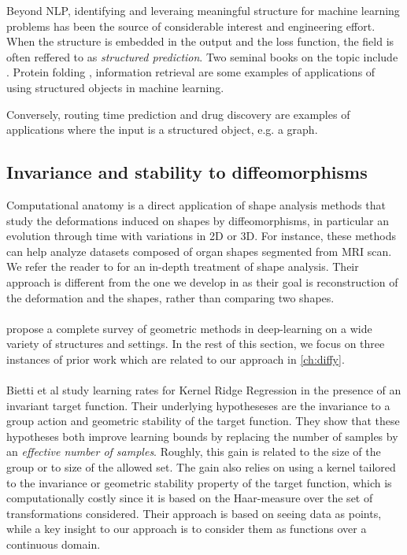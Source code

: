 Beyond NLP, identifying and leveraing meaningful structure for machine learning problems has been the source of considerable interest and engineering effort. When the structure is embedded in the output and the loss function, the field is often reffered to as \emph{structured prediction}. Two seminal books on the topic include \citep{advancedStructuredPrediction2014MIT,bakir2007predicting}. Protein folding  \cite{joachims2009}, information retrieval \cite{duchi2010} are some examples of applications of using structured objects in machine learning.

Conversely, routing time prediction \citep{deepmind-traffic} and drug discovery \citep{stokes-antibiotics} are examples of applications where the input is a structured object, e.g. a graph.

\subsection{Invariance and stability to diffeomorphisms}

Computational anatomy is a direct application of shape analysis methods that study the deformations induced on shapes by diffeomorphisms, in particular an evolution through time with variations in 2D or 3D. For instance, these methods can help analyze datasets composed of organ shapes segmented from MRI scan. We refer the reader to \cite{younes} for an in-depth treatment of shape analysis. Their approach is different from the one we develop in \cite{ch:diffy} as their goal is reconstruction of the deformation and the shapes, rather than comparing two shapes.

\paragraph{}
\cite{bronstein-geometric-deep-learning} propose a complete survey of geometric methods in deep-learning on a wide variety of structures and settings. In the rest of this section, we focus on three instances of prior work which are related to our approach in \cref{ch:diffy}.

\paragraph{}
Bietti et al study learning rates for Kernel Ridge Regression in the presence of an invariant target function. Their underlying hypotheseses are the invariance to a group action and geometric stability of the target function. They show that these hypotheses both improve learning bounds by replacing the number of samples by an \emph{effective number of samples}. Roughly, this gain is related to the size of the group or to size of the allowed set. The gain also relies on using a kernel tailored to the invariance or geometric stability property of the target function, which is computationally costly since it is based on the Haar-measure over the set of transformations considered. Their approach is based on seeing data as points, while a key insight to our approach is to consider them as functions over a continuous domain.

